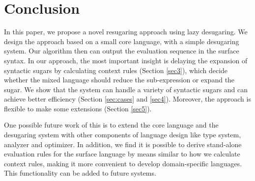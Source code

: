 \section{Conclusion}
\label{sec7}


In this paper, we propose a novel resugaring approach using lazy desugaring. We design the approach based on a small core language, with a simple desugaring system. Our algorithm then can output the evaluation sequence in the surface syntax. In our approach, the most important insight is delaying the expansion of syntactic sugars by calculating context rules (Section \ref{sec3}), which decide whether the mixed language should reduce the sub-expression or expand the sugar. We show that the system can handle a variety of syntactic sugars and can achieve better efficiency (Section \ref{sec:cases} and \ref{sec4}). Moreover, the approach is flexible to make some extensions (Section \ref{sec5}).

One possible future work of this is to extend the core language and the desugaring system with other components of language design like type system, analyzer and optimizer. In addition, we find it is possible to derive stand-alone evaluation rules for the surface language by means similar to how we calculate context rules, making it more convenient to develop domain-specific languages. This functionality can be added to future systems.
